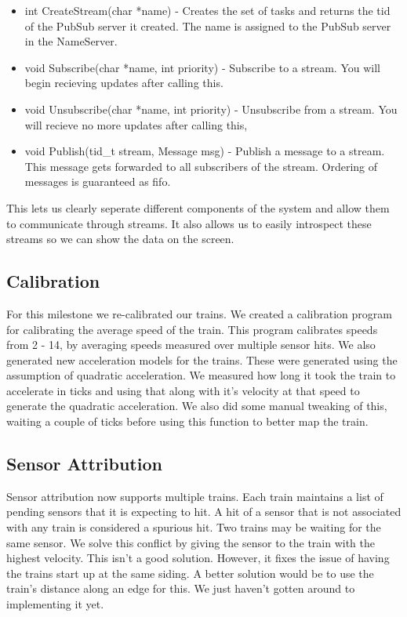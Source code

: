 \documentclass{article}
\begin{document}
\begin{itemize}
  \item int CreateStream(char *name) - Creates the set of tasks and returns the tid of the PubSub server it created. The name is assigned to the PubSub server in the NameServer.
  \item void Subscribe(char *name, int priority) - Subscribe to a stream. You will begin recieving updates after calling this.
  \item void Unsubscribe(char *name, int priority) - Unsubscribe from a stream. You will recieve no more updates after calling this,
  \item void Publish(tid\_t stream, Message msg) - Publish a message to a stream. This message gets forwarded to all subscribers of the stream. Ordering of messages is guaranteed as fifo.
\end{itemize}

This lets us clearly seperate different components of the system and allow them to communicate through streams. It also allows us to easily introspect these streams so we can show the data on the screen.

\subsection{Calibration}

For this milestone we re-calibrated our trains. We created a calibration program for calibrating the average speed of the train. This program calibrates speeds from 2 - 14, by averaging speeds measured over multiple sensor hits. We also generated new acceleration models for the trains. These were generated using the assumption of quadratic acceleration. We measured how long it took the train to accelerate in ticks and using that along with it's velocity at that speed to generate the quadratic acceleration. We also did some manual tweaking of this, waiting a couple of ticks before using this function to better map the train.

\subsection{Sensor Attribution}

Sensor attribution now supports multiple trains. Each train maintains a list of pending sensors that it is expecting to hit. A hit of a sensor that is not associated with any train is considered a spurious hit. Two trains may be waiting for the same sensor. We solve this conflict by giving the sensor to the train with the highest velocity. This isn't a good solution. However, it fixes the issue of having the trains start up at the same siding. A better solution would be to use the train's distance along an edge for this. We just haven't gotten around to implementing it yet.
\end{document}
